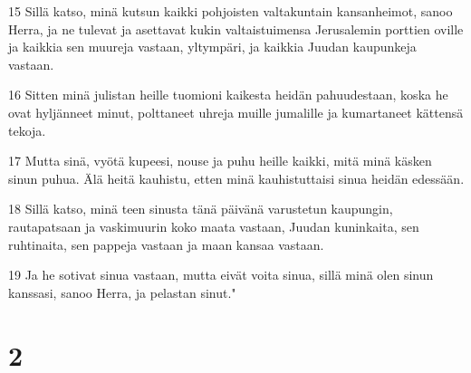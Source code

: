 \par 15 Sillä katso, minä kutsun kaikki pohjoisten valtakuntain kansanheimot, sanoo Herra, ja ne tulevat ja asettavat kukin valtaistuimensa Jerusalemin porttien oville ja kaikkia sen muureja vastaan, yltympäri, ja kaikkia Juudan kaupunkeja vastaan.
\par 16 Sitten minä julistan heille tuomioni kaikesta heidän pahuudestaan, koska he ovat hyljänneet minut, polttaneet uhreja muille jumalille ja kumartaneet kättensä tekoja.
\par 17 Mutta sinä, vyötä kupeesi, nouse ja puhu heille kaikki, mitä minä käsken sinun puhua. Älä heitä kauhistu, etten minä kauhistuttaisi sinua heidän edessään.
\par 18 Sillä katso, minä teen sinusta tänä päivänä varustetun kaupungin, rautapatsaan ja vaskimuurin koko maata vastaan, Juudan kuninkaita, sen ruhtinaita, sen pappeja vastaan ja maan kansaa vastaan.
\par 19 Ja he sotivat sinua vastaan, mutta eivät voita sinua, sillä minä olen sinun kanssasi, sanoo Herra, ja pelastan sinut."

\chapter{2}

